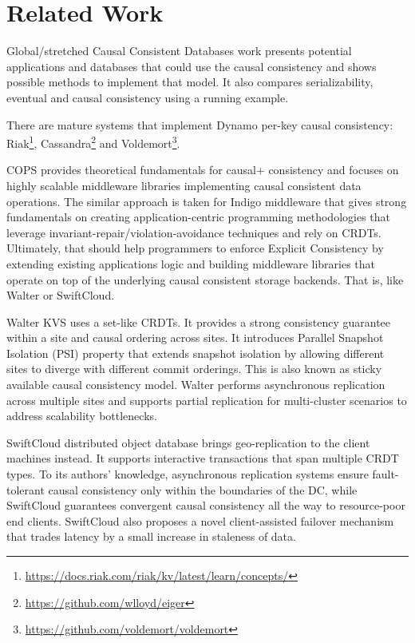 \documentclass[conference]{IEEEtran}
\begin{document}
\section{Related Work}
Global/stretched Causal Consistent Databases\cite{b6} work presents potential
applications and databases that could use the causal consistency and shows
possible methods to implement that model. It also compares serializability,
eventual and causal consistency using a running example.

There are mature systems that implement Dynamo\cite{b17} per-key causal
consistency:
Riak\footnote{\url{https://docs.riak.com/riak/kv/latest/learn/concepts/}},
Cassandra\footnote{\url{https://github.com/wlloyd/eiger}} and
Voldemort\footnote{\url{https://github.com/voldemort/voldemort}}.

COPS\cite{b1} provides theoretical fundamentals for causal+ consistency and
focuses on highly scalable middleware libraries implementing causal consistent
data operations. The similar approach is taken for Indigo middleware\cite{b10}
that gives strong fundamentals on creating application-centric programming
methodologies that leverage invariant-repair/violation-avoidance techniques and
rely on CRDTs. Ultimately, that should help programmers to enforce Explicit
Consistency by extending existing applications logic and building middleware
libraries that operate on top of the underlying causal consistent storage
backends. That is, like Walter\cite{b11} or SwiftCloud\cite{b12}.

Walter\cite{b11} KVS uses a set-like CRDTs. It provides a strong consistency
guarantee within a site and causal ordering across sites. It introduces
Parallel Snapshot Isolation (PSI) property that extends snapshot isolation by
allowing different sites to diverge with different commit orderings. This is
also known as sticky available causal consistency model. Walter performs
asynchronous replication across multiple sites and supports partial replication
for multi-cluster scenarios to address scalability bottlenecks.

SwiftCloud distributed object database\cite{b12} brings geo-replication to the
client machines instead. It supports interactive transactions that span
multiple CRDT types. To its authors' knowledge, asynchronous replication
systems ensure fault-tolerant causal consistency only within the boundaries of
the DC, while SwiftCloud guarantees convergent causal consistency all the way
to resource-poor end clients. SwiftCloud also proposes a novel client-assisted
failover mechanism that trades latency by a small increase in staleness of
data.
\end{document}
